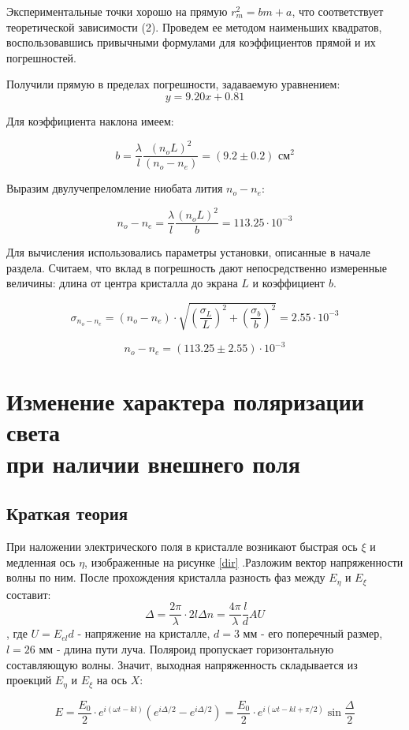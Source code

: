 \documentclass[15pt,a5paper,reqno]{article}
\begin{document}
	
	
	Экспериментальные точки хорошо на прямую $r_m^2 = bm + a$, что соответствует теоретической зависимости (2). Проведем ее методом наименьших квадратов, воспользовавшись привычными формулами для коэффициентов прямой и их погрешностей.
	
	Получили прямую в пределах погрешности, задаваемую уравнением:
	\[  y = 9.20x + 0.81     \]
	
	Для коэффициента наклона имеем: 
	
	\[ b = \frac{\lambda}{l} \frac{(n_oL)^2}{(n_o - n_e)} = (9.2 \pm 0.2) \text{ см}^2 \] 
	
	Выразим двулучепреломление ниобата лития $n_o - n_e$:
	
	\[ n_o - n_e = \frac{\lambda}{l}\frac{(n_oL)^2}{b} = 113.25 \cdot 10^{-3} \]
	
	Для вычисления использовались параметры установки, описанные в начале раздела. Считаем, что вклад в погрешность дают непосредственно измеренные величины: длина от центра кристалла до экрана $L$ и коэффициент $b$.
	
	\[ \sigma_{n_o - n_e} = (n_o - n_e)\cdot \sqrt{ \left(\frac{\sigma_L}{L}\right)^{2} + \left(\frac{\sigma_b}{b}\right)^{2} }  = 2.55 \cdot 10^{-3}    \]
	
	\[ n_o - n_e = (113.25 \pm 2.55)\cdot 10^{-3}   \]
	
	\section{Изменение характера поляризации света \\ при наличии внешнего поля}
    \subsection{Краткая теория}
	
	
	При наложении электрического поля в кристалле возникают быстрая ось $\xi$ и медленная ось $\eta$, изображенные на рисунке \ref{dir}
	.Разложим вектор напряженности волны по ним. После прохождения кристалла разность фаз между $E_\eta$ и $E_\xi$ составит:
	\[ \Delta = \frac{2\pi}{\lambda} \cdot2l\Delta n = \frac{4\pi}{\lambda} \frac{l}{d} AU \]
	, где $U = E_{el}d$ - напряжение на кристалле, $d = 3$ мм - его поперечный размер, $l = 26$ мм - длина пути луча. 
	Поляроид пропускает горизонтальную составляющую волны. Значит, выходная напряженность складывается из проекций $E_\eta$ и $E_\xi$ на ось $X$:
	
	\[ E = \frac{E_0}{2} \cdot e^{i(\omega t - kl)} (e^{i\Delta/2} - e^{i\Delta/2}) = \frac{E_0}{2} \cdot  e^{i(\omega t - kl + \pi/2)} \sin\frac{\Delta}{2} \]
	
\end{document}

